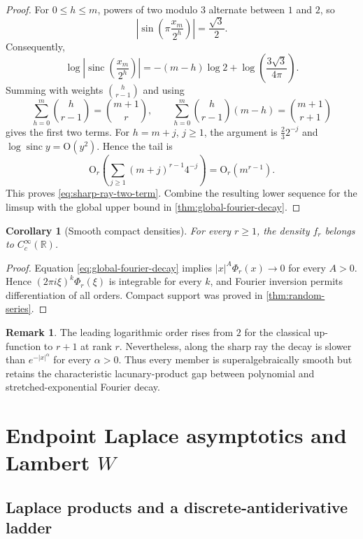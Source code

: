 \documentclass[11pt,a4paper]{article}
\theoremstyle{frontier}
\newtheorem{corollary}[theorem]{Corollary}
\theoremstyle{definition}
\newtheorem{remark}[theorem]{Remark}
\newcommand{\sinc}{\operatorname{sinc}}
\newcommand{\R}{\mathbb R}
\newcommand{\bigO}{\mathrm O}
\begin{document}
\begin{proof}
For $0\le h\le m$, powers of two modulo $3$ alternate between $1$ and $2$, so
\[
 \left|\sin\!\left(\pi\frac{x_m}{2^h}\right)\right|
 =\frac{\sqrt3}{2}.
\]
Consequently,
\[
 \log\left|\sinc\!\left(\frac{x_m}{2^h}\right)\right|
 =-(m-h)\log2+\log\!\left(\frac{3\sqrt3}{4\pi}\right).
\]
Summing with weights $\binom h{r-1}$ and using
\[
 \sum_{h=0}^{m}\binom h{r-1}=\binom{m+1}{r},
 \qquad
 \sum_{h=0}^{m}\binom h{r-1}(m-h)=\binom{m+1}{r+1}
\]
gives the first two terms.  For $h=m+j$, $j\ge1$, the argument is $\frac23 2^{-j}$ and
$\log\sinc y=\bigO(y^2)$.  Hence the tail is
\[
 \bigO_r\!\left(\sum_{j\ge1}(m+j)^{r-1}4^{-j}\right)
 =\bigO_r(m^{r-1}).
\]
This proves \eqref{eq:sharp-ray-two-term}.  Combine the resulting lower sequence for the limsup with the global upper bound in \cref{thm:global-fourier-decay}.
\end{proof}

\begin{corollary}[Smooth compact densities]\label{cor:smooth-density}
For every $r\ge1$, the density $f_r$ belongs to $C_c^\infty(\R)$.
\end{corollary}

\begin{proof}
Equation \eqref{eq:global-fourier-decay} implies $|x|^A\Phi_r(x)\to0$ for every $A>0$.  Hence $(2\pi i\xi)^k\Phi_r(\xi)$ is integrable for every $k$, and Fourier inversion permits differentiation of all orders.  Compact support was proved in \cref{thm:random-series}.
\end{proof}

\begin{remark}
The leading logarithmic order rises from $2$ for the classical up-function to $r+1$ at rank $r$.  Nevertheless, along the sharp ray the decay is slower than $e^{-|x|^\alpha}$ for every $\alpha>0$.  Thus every member is superalgebraically smooth but retains the characteristic lacunary-product gap between polynomial and stretched-exponential Fourier decay.
\end{remark}

\section{Endpoint Laplace asymptotics and Lambert \texorpdfstring{$W$}{W}}\label{sec:endpoint}

\subsection{Laplace products and a discrete-antiderivative ladder}
\end{document}
